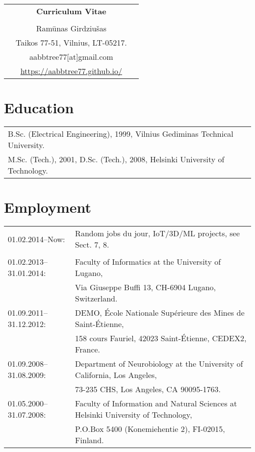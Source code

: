 \documentclass[a4paper,11pt]{article}
\begin{document}

%
%
\begin{center}
\begin{tabular}{ccc}
&\Large \textbf{Curriculum Vitae}&\\
\\
& Ram\={u}nas Girdziu\v{s}as &\\  
& Taikos 77-51, Vilnius, LT-05217. &\\
& aabbtree77[at]gmail.com &\\
& \url{https://aabbtree77.github.io/}
\end{tabular}
\end{center}
%
\section{Education}
%
\begin{tabular}{ll}
        B.Sc. (Electrical Engineering), 1999, Vilnius Gediminas Technical University.\\
        M.Sc. (Tech.), 2001, D.Sc. (Tech.), 2008, Helsinki University of Technology.
\end{tabular}
%
\section{Employment}
%
\begin{tabular}{ll}
01.02.2014--Now:        & Random jobs du jour, IoT/3D/ML projects, see Sect. 7, 8.\\  
                        & \\
01.02.2013--31.01.2014: & Faculty of Informatics at the University of Lugano,\\
                        & Via Giuseppe Buffi 13, CH-6904 Lugano, Switzerland. 
\\
01.09.2011--31.12.2012: & DEMO, \'{E}cole Nationale Sup\'{e}rieure des Mines de Saint-\'{E}tienne,\\
&158 cours Fauriel, 42023 Saint-\'Etienne, CEDEX2, France.
\\
01.09.2008--31.08.2009: & Department of Neurobiology at the University of California, Los Angeles,\\
&73-235 CHS, Los Angeles, CA 90095-1763.
\\
01.05.2000--31.07.2008: & Faculty of Information and Natural Sciences at Helsinki University of Technology,\\ 
&  P.O.Box 5400 (Konemiehentie 2), FI-02015, Finland.
\end{tabular}
\end{document}
